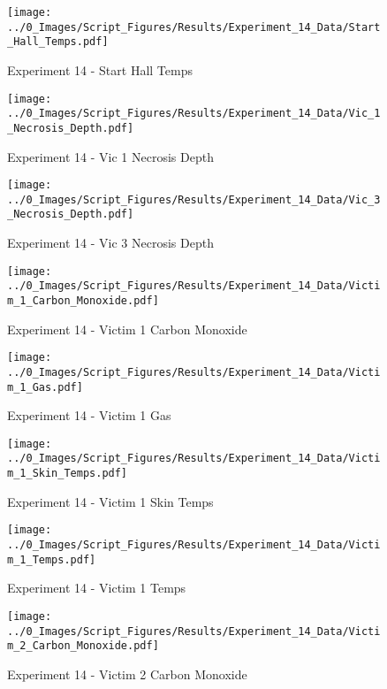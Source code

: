 	\begin{figure}[H]
		\centering
		\texttt{[image: ../0\_Images/Script\_Figures/Results/Experiment\_14\_Data/Start\_Hall\_Temps.pdf]}
		\caption[]{Experiment 14 - Start Hall Temps}
	\end{figure}
 
	\clearpage

	\begin{figure}[H]
		\centering
		\texttt{[image: ../0\_Images/Script\_Figures/Results/Experiment\_14\_Data/Vic\_1\_Necrosis\_Depth.pdf]}
		\caption[]{Experiment 14 - Vic 1 Necrosis Depth}
	\end{figure}
 

	\begin{figure}[H]
		\centering
		\texttt{[image: ../0\_Images/Script\_Figures/Results/Experiment\_14\_Data/Vic\_3\_Necrosis\_Depth.pdf]}
		\caption[]{Experiment 14 - Vic 3 Necrosis Depth}
	\end{figure}
 
	\clearpage

	\begin{figure}[H]
		\centering
		\texttt{[image: ../0\_Images/Script\_Figures/Results/Experiment\_14\_Data/Victim\_1\_Carbon\_Monoxide.pdf]}
		\caption[]{Experiment 14 - Victim 1 Carbon Monoxide}
	\end{figure}
 

	\begin{figure}[H]
		\centering
		\texttt{[image: ../0\_Images/Script\_Figures/Results/Experiment\_14\_Data/Victim\_1\_Gas.pdf]}
		\caption[]{Experiment 14 - Victim 1 Gas}
	\end{figure}
 
	\clearpage

	\begin{figure}[H]
		\centering
		\texttt{[image: ../0\_Images/Script\_Figures/Results/Experiment\_14\_Data/Victim\_1\_Skin\_Temps.pdf]}
		\caption[]{Experiment 14 - Victim 1 Skin Temps}
	\end{figure}
 

	\begin{figure}[H]
		\centering
		\texttt{[image: ../0\_Images/Script\_Figures/Results/Experiment\_14\_Data/Victim\_1\_Temps.pdf]}
		\caption[]{Experiment 14 - Victim 1 Temps}
	\end{figure}
 
	\clearpage

	\begin{figure}[H]
		\centering
		\texttt{[image: ../0\_Images/Script\_Figures/Results/Experiment\_14\_Data/Victim\_2\_Carbon\_Monoxide.pdf]}
		\caption[]{Experiment 14 - Victim 2 Carbon Monoxide}
	\end{figure}
 

